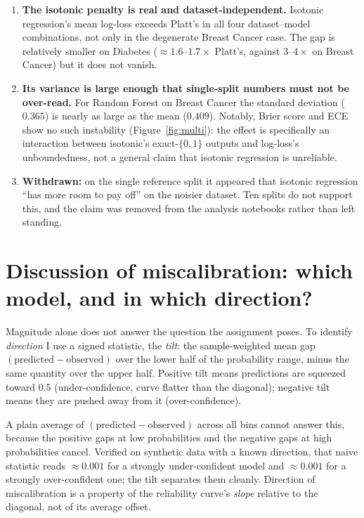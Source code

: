 \documentclass[11pt,a4paper]{article}
\begin{document}
\begin{enumerate}
\item \textbf{The isotonic penalty is real and dataset-independent.} Isotonic regression's mean log-loss
exceeds Platt's in all four dataset--model combinations, not only in the degenerate Breast Cancer case.
The gap is relatively smaller on Diabetes ($\approx 1.6$--$1.7\times$ Platt's, against $3$--$4\times$ on
Breast Cancer) but it does not vanish.
\item \textbf{Its variance is large enough that single-split numbers must not be over-read.} For Random
Forest on Breast Cancer the standard deviation ($0.365$) is nearly as large as the mean ($0.409$). Notably,
Brier score and ECE show no such instability (Figure~\ref{fig:multi}): the effect is specifically an
interaction between isotonic's exact-$\{0,1\}$ outputs and log-loss's unboundedness, not a general claim
that isotonic regression is unreliable.
\item \textbf{Withdrawn:} on the single reference split it appeared that isotonic regression ``has more
room to pay off'' on the noisier dataset. Ten splits do not support this, and the claim was removed from
the analysis notebooks rather than left standing.
\end{enumerate}

\section{Discussion of miscalibration: which model, and in which direction?}

Magnitude alone does not answer the question the assignment poses. To identify \emph{direction} I use a
signed statistic, the \emph{tilt}: the sample-weighted mean gap $(\text{predicted} - \text{observed})$ over
the lower half of the probability range, minus the same quantity over the upper half. Positive tilt means
predictions are squeezed toward $0.5$ (under-confidence, curve flatter than the diagonal); negative tilt
means they are pushed away from it (over-confidence).

A plain average of $(\text{predicted} - \text{observed})$ across all bins cannot answer this, because the
positive gaps at low probabilities and the negative gaps at high probabilities cancel. Verified on
synthetic data with a known direction, that naive statistic reads $\approx 0.001$ for a strongly
under-confident model and $\approx 0.001$ for a strongly over-confident one; the tilt separates them
cleanly. Direction of miscalibration is a property of the reliability curve's \emph{slope} relative to the
diagonal, not of its average offset.
\end{document}
